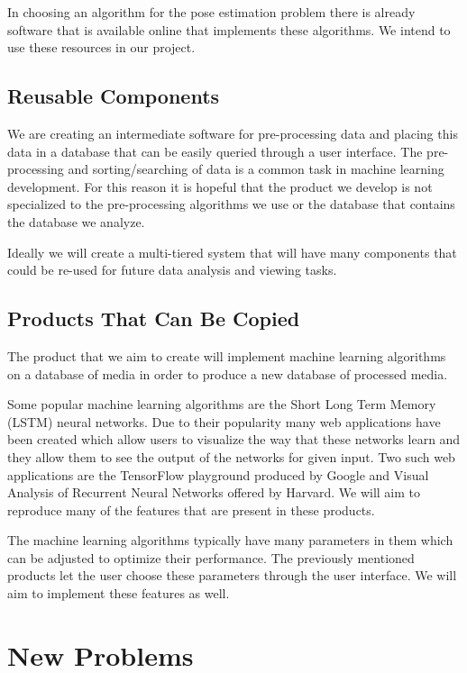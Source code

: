 \documentclass{scrreprt}
\begin{document}
{In choosing an algorithm for the pose estimation problem there is
already software that is available online that implements these
algorithms. We intend to use these resources in our project.}

\subsection{Reusable Components}
\label{reusable-components}

{We are creating an intermediate software for pre-processing data and
placing this data in a database that can be easily queried through a
user interface. The pre-processing and sorting/searching of data is a
common task in machine learning development. For this reason it is
hopeful that the product we develop is not specialized to the
pre-processing algorithms we use or the database that contains the
database we analyze.}

{Ideally we will create a multi-tiered system that will have many
components that could be re-used for future data analysis and viewing
tasks.}

\subsection{Products That Can Be Copied}

{The product that we aim to create will implement machine learning
algorithms on a database of media in order to produce a new database of
processed media.}

{Some popular machine learning algorithms are the Short Long Term Memory
(LSTM) neural networks. Due to their popularity many web applications
have been created which allow users to visualize the way that these
networks learn and they allow them to see the output of the networks for
given input. Two such web applications are the TensorFlow playground
produced by Google and Visual Analysis of Recurrent Neural Networks
offered by Harvard. We will aim to reproduce many of the features that
are present in these products.}

{The machine learning algorithms typically have many parameters in them
which can be adjusted to optimize their performance. The previously
mentioned products let the user choose these parameters through the user
interface. We will aim to implement these features as well.}

\section{New Problems}
\end{document}
